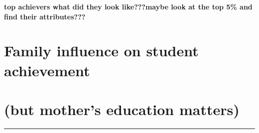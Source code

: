 \documentclass[
]{article}
\begin{document}
\textbf{top achievers what did they look like???maybe look at the top
5\% and find their attributes???}

\hypertarget{family-influence-on-student-achievement}{%
\section{Family influence on student
achievement}\label{family-influence-on-student-achievement}}

\hypertarget{but-mothers-education-matters}{%
\section{(but mother's education
matters)}\label{but-mothers-education-matters}}

\begin{center}\rule{0.5\linewidth}{0.5pt}\end{center}
\end{document}
